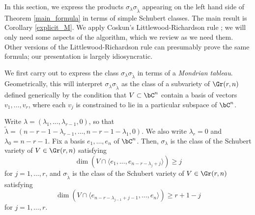 In this section, we express the products $\sigma_{\lambda}\sigma_{\widetilde{\lambda}}$ appearing on the left hand side of Theorem \ref{main_formula} in terms of simple Schubert classes. The main result is Corollary \ref{explicit_M}. We apply Coskun's Littlewood-Richardson rule \cite{Cos09}; we will only need some aspects of the algorithm, which we review as we need them. Other versions of the Littlewood-Richardson rule can presumably prove the same formula; our presentation is largely idiosyncratic.

We first carry out \cite[Algorithm 3.19]{Cos09} to express the class $\sigma_{\lambda}\sigma_{\widetilde{\lambda}}$ in terms of a \emph{Mondrian tableau}. Geometrically, this will interpret $\sigma_{\lambda}\sigma_{\widetilde{\lambda}}$ as the class of a subvariety of $\Gr(r,n)$ defined generically by the condition that $V\subset\bC^n$ contain a basis of vectors $v_1,\ldots,v_r$, where each $v_j$ is constrained to lie in a particular subspace of $\bC^n$.

Write $\lambda=(\lambda_1,\ldots,\lambda_{r-1},0)$, so that $\widetilde{\lambda}=(n-r-1-\lambda_{r-1},\ldots,n-r-1-\lambda_1,0)$. We also write $\lambda_r=0$ and $\lambda_0=n-r-1$. Fix a basis $e_1,\ldots,e_n$ of $\bC^n$. Then, $\sigma_{\lambda}$ is the class of the Schubert variety of $V\in\Gr(r,n)$ satisfying
\begin{equation*}
\dim(V\cap\langle e_1,\ldots,e_{n-r-\lambda_j+j}\rangle)\ge j
\end{equation*}
for $j=1,\ldots,r$, and $\sigma_{\widetilde{\lambda}}$ is the class of the Schubert variety of $V\in\Gr(r,n)$ satisfying
\begin{equation*}
\dim(V\cap\langle e_{n-r-\lambda_{j-1}+j-1},\ldots,e_{n}\rangle)\ge r+1-j
\end{equation*}
for $j=1,\ldots,r$.

